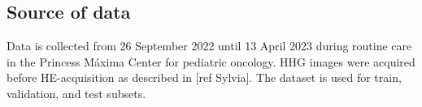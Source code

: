 \subsection{Source of data}

Data is collected from 26 September 2022 until 13 April 2023 during routine care in the Princess Máxima Center for pediatric oncology.
HHG images were acquired before HE-acquisition as described in [ref Sylvia].
The dataset is used for train, validation, and test subsets.
